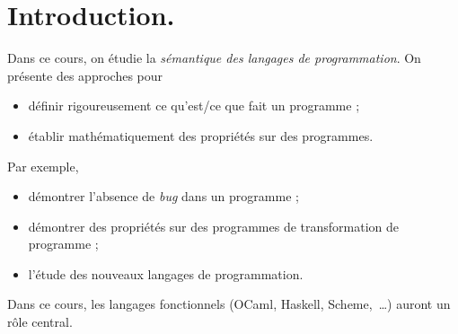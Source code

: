 \documentclass[../main]{subfiles}
\begin{document}
  \chapter*{Introduction.} 

  Dans ce cours, on étudie la \textit{sémantique des langages de programmation}. On présente des approches pour
  \begin{itemize}
    \item définir rigoureusement ce qu'est/ce que fait un programme ;
    \item établir mathématiquement des propriétés sur des programmes. 
  \end{itemize}

  Par exemple,
  \begin{itemize}
    \item démontrer l'absence de \textit{bug} dans un programme ;
    \item démontrer des propriétés sur des programmes de transformation de programme ;
    \item l'étude des nouveaux langages de programmation.
  \end{itemize}

  Dans ce cours, les langages fonctionnels (OCaml, Haskell, Scheme,~\ldots) auront un rôle central.
\end{document}
